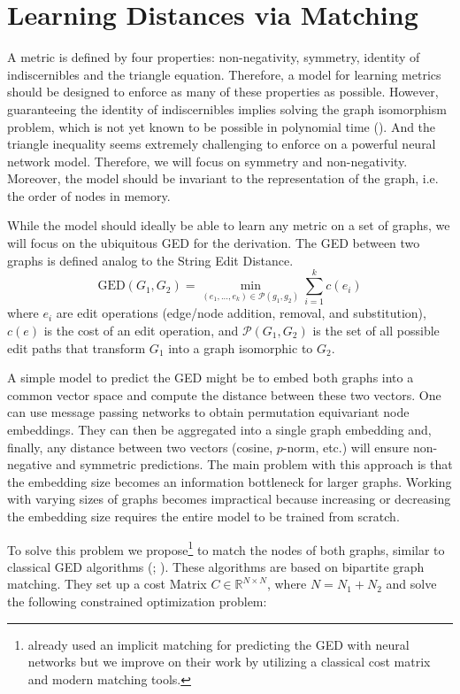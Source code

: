 \section{Learning Distances via Matching}

A metric is defined by four properties: non-negativity, symmetry, identity of indiscernibles and the triangle equation. Therefore, a model for learning metrics should be designed to enforce as many of these properties as possible. However, guaranteeing the identity of indiscernibles implies solving the graph isomorphism problem, which is not yet known to be possible in polynomial time (\citealp{np_complete1998}). And the triangle inequality seems extremely challenging to enforce on a powerful neural network model. Therefore, we will focus on symmetry and non-negativity. Moreover, the model should be invariant to the representation of the graph, i.e. the order of nodes in memory.

While the model should ideally be able to learn any metric on a set of graphs, we will focus on the ubiquitous GED for the derivation. The GED between two graphs is defined analog to the String Edit Distance.
\begin{equation}
     \text{GED}(G_{1},G_{2}) = \min_{(e_{1},...,e_{k}) \in \mathcal{P}(g_{1},g_{2})} \sum_{i=1}^{k} c(e_{i})
\end{equation}
where $e_{i}$ are edit operations (edge/node addition, removal, and substitution), $c(e)$ is the cost of an edit operation, and $\mathcal{P}(G_{1},G_{2})$ is the set of all possible edit paths that transform $G_{1}$ into a graph isomorphic to $G_{2}$.

A simple model to predict the GED might be to embed both graphs into a common vector space and compute the distance between these two vectors. One can use message passing networks to obtain permutation equivariant node embeddings. They can then be aggregated into a single graph embedding and, finally, any distance between two vectors (cosine, $p$-norm, etc.) will ensure non-negative and symmetric predictions. The main problem with this approach is that the embedding size becomes an information bottleneck for larger graphs. Working with varying sizes of graphs becomes impractical because increasing or decreasing the embedding size requires the entire model to be trained from scratch.

To solve this problem we propose\footnote{\cite{riba2018} already used an implicit matching for predicting the GED with neural networks but we improve on their work by utilizing a classical cost matrix and modern matching tools.} to match the nodes of both graphs, similar to classical GED algorithms (\citealp{hungarian2009}; \citealp{frankhauser2011}). These algorithms are based on bipartite graph matching. They set up a cost Matrix $C \in \mathbb{R}^{N \times N}$, where $N = N_1 + N_2$ and solve the following constrained optimization problem:

